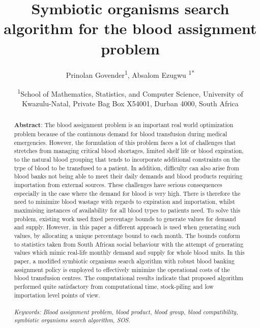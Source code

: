 \documentclass{article}
\title{Symbiotic organisms search algorithm for the blood assignment problem}
\author{Prinolan Govender\textsuperscript{1}, Absalom Ezugwu \textsuperscript{1*}}
\date{\textsuperscript{1}School of Mathematics, Statistics, and Computer Science, University of Kwazulu-Natal, Private Bag Box X54001, Durban 4000, South Africa}
\begin{document}
\maketitle
\begin{abstract}
  \textbf{Abstract}: The blood assignment problem is an important real world optimization problem because of the continuous demand for blood transfusion during medical emergencies. However, the formulation of this problem faces a lot of challenges that stretches from managing critical blood shortages, limited shelf life or blood expiration, to the natural blood grouping that tends to incorporate additional constraints on the type of blood to be transfused to a patient. In addition, difficulty can also arise from blood banks not being able to meet their daily demands and blood products requiring importation from external sources. These challenges have serious consequences especially in the case where the demand for blood is very high. There is therefore the need to minimize blood wastage with regards to expiration and importation, whilst maximising instances of availability for all blood types to patients need. To solve this problem, existing work used fixed percentage bounds to generate values for demand and supply. However, in this paper a different approach is used when generating such values, by allocating a unique percentage bound to each month. The bounds conform to statistics taken from South African social behaviour with the attempt of generating values which mimic real-life monthly demand and supply for whole blood units. In this paper, a modified symbiotic organisms search algorithm with robust blood banking assignment policy is employed to effectively minimize the operational costs of the blood transfusion centres. The computational results indicate that proposed algorithm performed quite satisfactory from computational time, stock-piling and low importation level points of view.
  \\
  \\
\textit{Keywords: Blood assignment problem, blood product, blood group, blood compatibility, symbiotic organisms search algorithm, SOS.}

\end{abstract}
\end{document}
